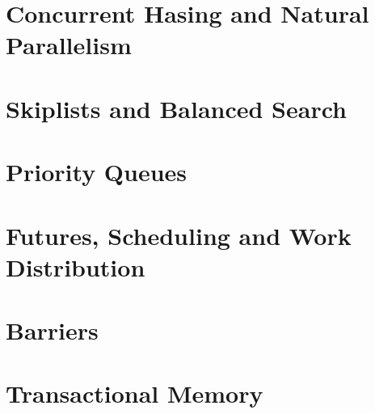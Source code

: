 \documentclass[letter,12pt]{report}
\begin{document}
\chapter{Concurrent Hasing and Natural Parallelism}

%
%

\chapter{Skiplists and Balanced Search}
%
%
%

\chapter{Priority Queues}
%
%

\chapter{Futures, Scheduling and Work Distribution}
%
%
%

\chapter{Barriers}
%
%

\chapter{Transactional Memory}
%
%
\end{document}
